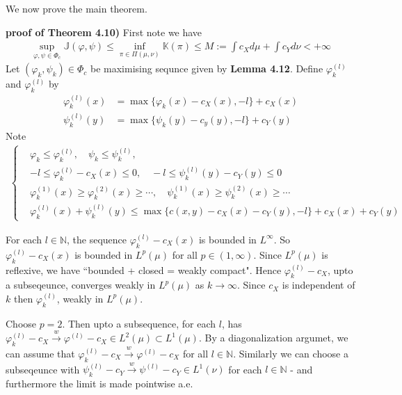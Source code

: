 \documentclass[12pt,a4paper]{article}
\newenvironment{proof}
{\begin{changemargin}{1cm}{0.5cm} 
	}%
	{\end{changemargin}
}
\newenvironment{p}
{\begin{proof} 
	}%
	{\end{proof}
}
\begin{document}
We now prove the main theorem.
\s

\begin{p}
\textbf{proof of Theorem 4.10)} First note we have
\begin{align*}
\sup_{\varphi, \psi \in \Phi_c}\mathbb{J}(\varphi, \psi) \leq \inf_{\pi \in \Pi(\mu, \nu)} \mathbb{K}(\pi) \leq M := \int c_Xd\mu + \int c_Y d\nu< +\infty
\end{align*}
\quad Let $(\varphi_k, \psi_k) \in \Phi_c$ be maximising sequnce given by \textbf{Lemma 4.12}. Define $\varphi_k^{(l)}$ and $\varphi_k^{(l)}$ by
\begin{align*}
\varphi_k^{(l)}(x) &= \max \{\varphi_k(x) - c_X(x), - l\} + c_X(x) \\
\psi_k^{(l)}(y) &= \max \{ \psi_k(y)- c_y(y) , -l\} + c_Y(y)
\end{align*}
Note
\begin{align*}
\begin{cases}
& \varphi_k \leq \varphi_k^{(l)}, \quad \psi_k \leq \psi_k^{(l)},\\
& -l \leq \varphi_k^{(l)} - c_X(x) \leq 0, \quad  -l \leq \psi_k^{(l)}(y) - c_Y(y)\leq 0\\
& \varphi_k^{(1)}(x) \geq \varphi_k^{(2)}(x) \geq \cdots, \quad \psi_k^{(1)}(x) \geq \psi_k^{(2)}(x) \geq \cdots \\
& \varphi_k^{(l)}(x) + \psi_k^{(l)}(y) \leq \max \{ c(x,y) - c_X(x) - c_Y(y), -l\} + c_X(x) + c_Y(y)
\end{cases}
\end{align*}

\quad For each $l\in \mathbb{N}$, the sequence $\varphi_k^{(l)} - c_X(x)$ is bounded in $L^{\infty}$. So $\varphi_k^{(l)} - c_X(x)$ is bounded in $L^{p}(\mu)$ for all $p\in (1,\infty)$. Since $L^p(\mu)$ is reflexive, we have ``bounded + closed = weakly compact". Hence $\varphi_k^{(l)} -c_X$, upto a subseqeunce, converges weakly in $L^p(\mu)$ as $k\rightarrow \infty$. Since $c_X$ is independent of $k$ then $\varphi_k^{(l)}$, weakly in $L^p(\mu)$.

\quad Choose $p=2$. Then upto a subsequence, for each $l$, has $\varphi_k^{(l)} - c_X \xrightarrow{w} \varphi^{(l)} - c_X \in L^2(\mu) \subset L^1(\mu)$. By a diagonalization argumet, we can assume that $\varphi_k^{(l)} - c_X  \xrightarrow{w} \varphi^{(l)}- c_X$ for all $l\in \mathbb{N}$. Similarly we can choose a subseqeunce with $\psi_k^{(l)} - c_Y\xrightarrow{w} \psi^{(l)} - c_Y \in L^1(\nu)$ for each $l\in \mathbb{N}$ - and furthermore the limit is made pointwise a.e.


\end{p}
\end{document}
